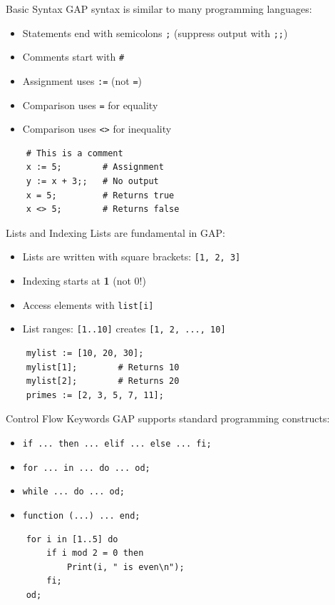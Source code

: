 \documentclass{beamer}
\begin{document}
\begin{frame}[fragile]{Basic Syntax}
    GAP syntax is similar to many programming languages:
    \begin{itemize}
        \item<1-> Statements end with semicolons \verb|;| (suppress output with \verb|;;|)
        \item<2-> Comments start with \verb|#|
        \item<3-> Assignment uses \verb|:=| (not \verb|=|)
        \item<4-> Comparison uses \verb|=| for equality
        \item<5-> Comparison uses \verb|<>| for inequality
    \end{itemize}
    \pause[5]
    \begin{verbatim}
    # This is a comment
    x := 5;        # Assignment
    y := x + 3;;   # No output
    x = 5;         # Returns true
    x <> 5;        # Returns false
    \end{verbatim}
\end{frame}

\begin{frame}[fragile]{Lists and Indexing}
    Lists are fundamental in GAP:
    \begin{itemize}
        \item<1-> Lists are written with square brackets: \verb|[1, 2, 3]|
        \item<2-> Indexing starts at \textbf{1} (not 0!)
        \item<3-> Access elements with \verb|list[i]|
        \item<4-> List ranges: \verb|[1..10]| creates \verb|[1, 2, ..., 10]|
    \end{itemize}
    \pause[4]
    \begin{verbatim}
    mylist := [10, 20, 30];
    mylist[1];        # Returns 10
    mylist[2];        # Returns 20
    primes := [2, 3, 5, 7, 11];
    \end{verbatim}
\end{frame}

\begin{frame}[fragile]{Control Flow Keywords}
    GAP supports standard programming constructs:
    \begin{itemize}
        \item<1-> \verb|if ... then ... elif ... else ... fi;|
        \item<2-> \verb|for ... in ... do ... od;|
        \item<3-> \verb|while ... do ... od;|
        \item<4-> \verb|function (...) ... end;|
    \end{itemize}
    \pause[4]
    \begin{verbatim}
    for i in [1..5] do
        if i mod 2 = 0 then
            Print(i, " is even\n");
        fi;
    od;
    \end{verbatim}
\end{frame}
\end{document}
